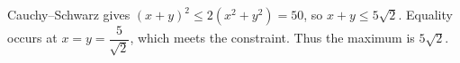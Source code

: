 Cauchy--Schwarz gives $(x+y)^2\le2(x^2+y^2)=50$, so $x+y\le5\sqrt2$. Equality occurs at $x=y=\dfrac{5}{\sqrt2}$, which meets the constraint. Thus the maximum is $\boxed{5\sqrt2}$.
